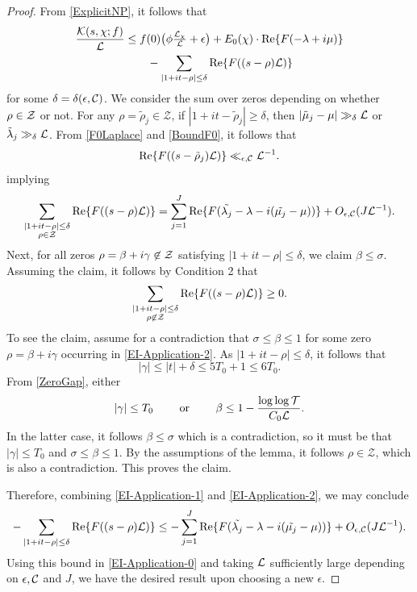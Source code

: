 \documentclass[12pt,psamsfonts]{amsart}
\theoremstyle{definition}
\theoremstyle{remark}
\numberwithin{equation}{section}
\begin{document}
\begin{proof} From \cref{ExplicitNP}, it follows that
\begin{equation}
\begin{aligned}
\frac{\mathcal{K}(s,\chi; f)}{\mathcal{L}} & \leq f(0)\big( \phi \tfrac{\mathcal{L}_{\chi}}{\mathcal{L}} + \epsilon \big)  + E_0(\chi) \cdot \mathrm{Re}\{  F(-\lambda + i\mu) \} \\
& \qquad - \sum_{|1+it-\rho| \leq \delta} \mathrm{Re}\{ F( (s-\rho) \mathcal{L}) \}
\end{aligned}
\label{EI-Application-0}
\end{equation}
for some $\delta = \delta(\epsilon,\mathcal{C})$.  We consider the sum over zeros depending on whether $\rho \in \mathcal{Z}$ or not.  For any $\rho = \tilde{\rho}_j \in \mathcal{Z}$, if $|1+it-\tilde{\rho}_j| \geq \delta$, then $|\tilde{\mu}_j-\mu| \gg_{\delta} \mathcal{L}$ or $\tilde{\lambda}_j \gg_{\delta} \mathcal{L}$. From \eqref{F0Laplace} and \eqref{BoundF0}, it follows that
\[
\mathrm{Re}\{F((s-\tilde{\rho}_j)\mathcal{L})\} \ll_{\epsilon, \mathcal{C}} \mathcal{L}^{-1}.
\]
implying
\begin{equation}
 \sum_{ \substack{ |1+it-\rho| \leq \delta \\ \rho \in \mathcal{Z}} } \mathrm{Re}\{ F( (s-\rho) \mathcal{L}) \} = \sum_{j=1}^J \mathrm{Re}\{ F(\tilde{\lambda_j}-\lambda - i(\tilde{\mu_j}-\mu) ) \} +  O_{\epsilon, \mathcal{C}}( J \mathcal{L}^{-1}).
 \label{EI-Application-1}
\end{equation}
Next, for all zeros $\rho = \beta + i\gamma \not\in \mathcal{Z}$ satisfying $|1+it-\rho| \leq \delta$, we claim $\beta \leq \sigma$. Assuming the claim, it follows by Condition 2 that
\begin{equation}
\sum_{ \substack{ |1+it-\rho| \leq \delta \\ \rho \not\in \mathcal{Z}} } \mathrm{Re}\{ F( (s-\rho) \mathcal{L}) \} \geq 0. 
\label{EI-Application-2}
\end{equation}
To see the claim, assume for a contradiction that $\sigma \leq \beta \leq 1$ for some zero $\rho = \beta + i\gamma$ occurring in \eqref{EI-Application-2}. As $|1+it-\rho| \leq \delta$, it follows that
\[
|\gamma| \leq |t|+\delta \leq 5T_0+1 \leq 6T_0.
\]
From \cref{ZeroGap}, either 
\[
|\gamma| \leq T_0 \qquad \text{ or } \qquad \beta \leq 1-\frac{\log \log \mathcal{T}}{C_0 \mathcal{L}}. 
\]
In the latter case, it follows $\beta \leq \sigma$ which is a contradiction, so it must be that $|\gamma| \leq T_0$ and $\sigma \leq \beta \leq 1$. By the assumptions of the lemma, it follows $\rho \in \mathcal{Z}$, which is also a contradiction. This proves the claim.

Therefore, combining \eqref{EI-Application-1} and \eqref{EI-Application-2}, we may conclude 
\[
- \sum_{|1+it-\rho| \leq \delta} \mathrm{Re}\{ F( (s-\rho) \mathcal{L}) \} \leq -\sum_{j=1}^J \mathrm{Re}\{ F(\tilde{\lambda_j}-\lambda - i(\tilde{\mu_j}-\mu) ) \} +  O_{\epsilon, \mathcal{C}}( J \mathcal{L}^{-1}).
\]
Using this bound in \eqref{EI-Application-0} and taking $\mathcal{L}$ sufficiently large depending on $\epsilon, \mathcal{C}$ and $J$, we have the desired result upon choosing a new $\epsilon$. 
\end{proof}
\end{document}
